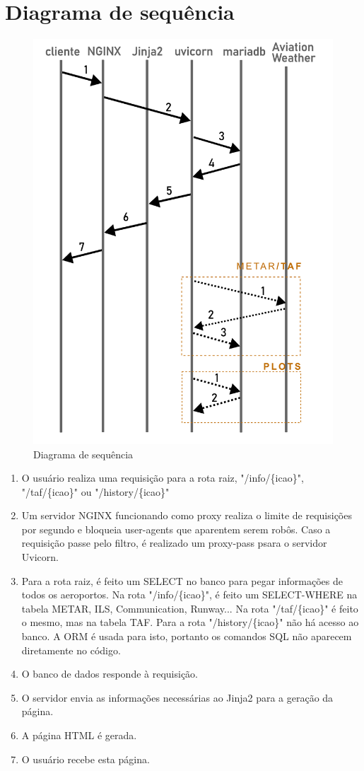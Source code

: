 \section{Diagrama de sequência}

\begin{figure}[ht]
    \begin{center}
    \includegraphics[width=0.5\linewidth]{img/diagrama-tempo.png}
    \caption{Diagrama de sequência}
    \label{fig:tempo}
    \end{center}
\end{figure}

\begin{enumerate}
\item O usuário realiza uma requisição para a rota raiz, "/info/\{icao\}", "/taf/\{icao\}"
ou "/history/\{icao\}"
\item Um servidor NGINX funcionando como proxy realiza o limite de requisições por segundo
e bloqueia user-agents que aparentem serem robôs. Caso a requisição passe pelo filtro, é
realizado um proxy-pass psara o servidor Uvicorn.
\item Para a rota raiz, é feito um SELECT no banco para pegar informações de todos os
aeroportos. Na rota "/info/\{icao\}", é feito um SELECT-WHERE na tabela METAR, ILS, Communication, Runway...
Na rota "/taf/\{icao\}" é feito o mesmo, mas na tabela TAF. Para a rota "/history/\{icao\}"
não há acesso ao banco.
A ORM é usada para isto, portanto os comandos SQL não aparecem diretamente no código.
\item O banco de dados responde à requisição.
\item O servidor envia as informações necessárias ao Jinja2 para a geração da página.
\item A página HTML é gerada.
\item O usuário recebe esta página.
\end{enumerate}

